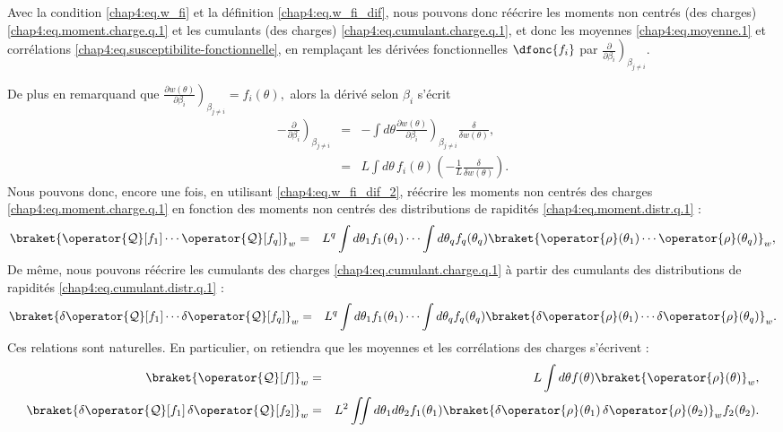 \medskip

Avec la condition \eqref{chap4:eq.w_fi} et la définition \eqref{chap4:eq.w_fi_dif}, nous pouvons donc réécrire les moments non centrés (des charges) \eqref{chap4:eq.moment.charge.q.1} et les cumulants (des charges) \eqref{chap4:eq.cumulant.charge.q.1}, et donc les moyennes \eqref{chap4:eq.moyenne.1} et corrélations \eqref{chap4:eq.susceptibilite-fonctionnelle}, en remplaçant les dérivées fonctionnelles $\dfonc{f_i}$ par $\left. \frac{ \partial}{ \partial \beta_i } \right)_{\beta_{j\neq i}}$.

De plus en remarquand que 
\(
	\left. \frac{ \partial w (\theta) }{ \partial \beta_i } \right)_{\beta_{j\neq i}} = f_i(\theta) ,		
\)
alors la dérivé selon $\beta_i$ s'écrit 
\begin{eqnarray}\label{chap4:eq.w_fi_dif_2}
	-\left. \frac{ \partial}{ \partial \beta_i } \right)_{\beta_{j\neq i}} & = & - \int d \theta  \left. \frac{ \partial w (\theta) }{ \partial \beta_i } \right)_{\beta_{j\neq i}} \frac{\delta}{\delta w(\theta)} \nonumber ,\\
	& = & L \int d\theta \, f_i(\theta) \left ( - \frac{1}{L} 	\frac{\delta}{\delta w(\theta)} \right ) \label{chap4:eq.moment.charge.q.2}.
\end{eqnarray}
Nous pouvons donc, encore une fois, en utilisant \eqref{chap4:eq.w_fi_dif_2}, réécrire les moments non centrés des charges \eqref{chap4:eq.moment.charge.q.1} en fonction des moments non centrés des distributions de rapidités \eqref{chap4:eq.moment.distr.q.1} : 
\begin{eqnarray}
	\braket{\operator{\mathcal{Q}}[f_1] \cdots \operator{\mathcal{Q}}[f_q]}_w  & = & L^q \int d\theta_1 f_1(\theta_1)  \cdots  \int d\theta_q f_q(\theta_q)  \braket{\operator{\rho}(\theta_1)\cdots \operator{\rho}(\theta_q)}_w,	
\end{eqnarray}
De même, nous pouvons réécrire les cumulants des charges \eqref{chap4:eq.cumulant.charge.q.1} à partir des cumulants des distributions de rapidités \eqref{chap4:eq.cumulant.distr.q.1} :
\begin{eqnarray}
	\braket{\delta\operator{\mathcal{Q}}[f_1] \cdots \delta\operator{\mathcal{Q}}[f_q]}_w  & = & L^q \int d\theta_1 f_1(\theta_1)  \cdots  \int d\theta_q f_q(\theta_q)  \braket{\delta\operator{\rho}(\theta_1)\cdots \delta\operator{\rho}(\theta_q)}_w.	
\end{eqnarray}
Ces relations sont naturelles. En particulier, on retiendra que les moyennes et les corrélations des charges s’écrivent :
\begin{eqnarray}
	\braket{\operator{\mathcal{Q}}[f] }_w  & = & L \int d\theta f(\theta)  \braket{\operator{\rho}(\theta)}_w,\label{chap4:eq.moment.distr.q.10}\\
	\braket{\delta\operator{\mathcal{Q}}[f_1] \, \delta\operator{\mathcal{Q}}[f_2]}_w  & = & L^2 \iint d\theta_1 d\theta_2 f_1(\theta_1) \braket{\delta\operator{\rho}(\theta_1)\, \delta\operator{\rho}(\theta_2)}_w  f_2(\theta_2) \label{chap4:eq.cumulant.distr.q.10} .		
\end{eqnarray}



